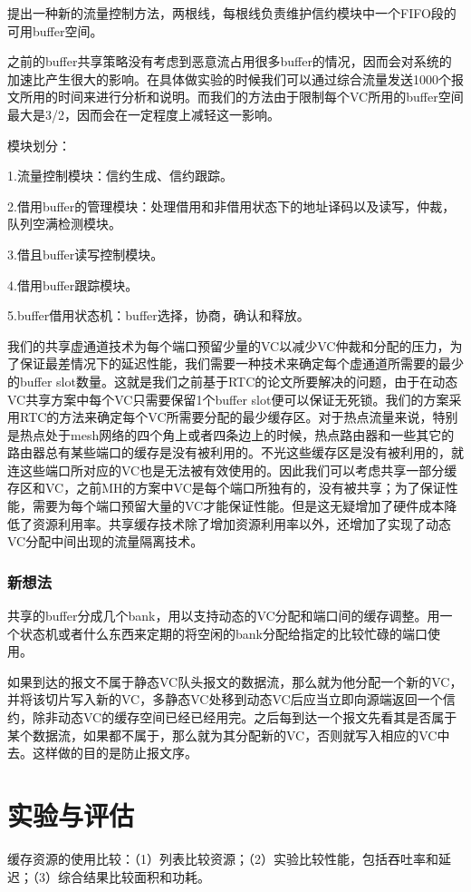 ﻿\documentclass[10pt,journal]{IEEEtran}
\begin{document}
提出一种新的流量控制方法，两根线，每根线负责维护信约模块中一个FIFO段的可用buffer空间。

之前的buffer共享策略没有考虑到恶意流占用很多buffer的情况，因而会对系统的加速比产生很大的影响。在具体做实验的时候我们可以通过综合流量发送1000个报文所用的时间来进行分析和说明。而我们的方法由于限制每个VC所用的buffer空间最大是3/2，因而会在一定程度上减轻这一影响。

模块划分：

1.流量控制模块：信约生成、信约跟踪。

2.借用buffer的管理模块：处理借用和非借用状态下的地址译码以及读写，仲裁，队列空满检测模块。

3.借且buffer读写控制模块。

4.借用buffer跟踪模块。

5.buffer借用状态机：buffer选择，协商，确认和释放。

我们的共享虚通道技术为每个端口预留少量的VC以减少VC仲裁和分配的压力，为了保证最差情况下的延迟性能，我们需要一种技术来确定每个虚通道所需要的最少的buffer slot数量。这就是我们之前基于RTC的论文所要解决的问题，由于在动态VC共享方案中每个VC只需要保留1个buffer slot便可以保证无死锁。我们的方案采用RTC的方法来确定每个VC所需要分配的最少缓存区。对于热点流量来说，特别是热点处于mesh网络的四个角上或者四条边上的时候，热点路由器和一些其它的路由器总有某些端口的缓存是没有被利用的。不光这些缓存区是没有被利用的，就连这些端口所对应的VC也是无法被有效使用的。因此我们可以考虑共享一部分缓存区和VC，之前MH的方案中VC是每个端口所独有的，没有被共享；为了保证性能，需要为每个端口预留大量的VC才能保证性能。但是这无疑增加了硬件成本降低了资源利用率。共享缓存技术除了增加资源利用率以外，还增加了实现了动态VC分配中间出现的流量隔离技术。

\subsubsection{新想法}
共享的buffer分成几个bank，用以支持动态的VC分配和端口间的缓存调整。用一个状态机或者什么东西来定期的将空闲的bank分配给指定的比较忙碌的端口使用。

如果到达的报文不属于静态VC队头报文的数据流，那么就为他分配一个新的VC，并将该切片写入新的VC，多静态VC处移到动态VC后应当立即向源端返回一个信约，除非动态VC的缓存空间已经已经用完。之后每到达一个报文先看其是否属于某个数据流，如果都不属于，那么就为其分配新的VC，否则就写入相应的VC中去。这样做的目的是防止报文序。

\section{实验与评估}
缓存资源的使用比较：（1）列表比较资源；（2）实验比较性能，包括吞吐率和延迟；（3）综合结果比较面积和功耗。
\end{document}

